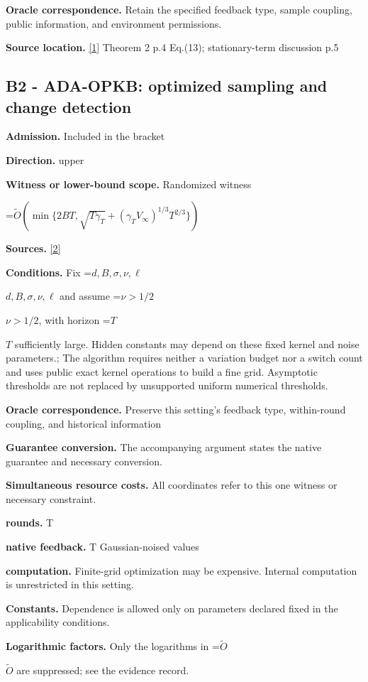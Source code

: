 \documentclass[10pt,a4paper]{article}
\newcommand{\AtlasMath}[1]{\par\begingroup\centering\setbox0=\hbox{$\displaystyle #1$}\ifdim\wd0>1.4\linewidth\typeout{ATLAS WIDE FORMULA: \the\wd0}\fi\ifdim\wd0>\linewidth\resizebox{\linewidth}{!}{\box0}\else\box0\fi\par\endgroup}
\newcommand{\AtlasInlineMath}[1]{\begingroup\setbox0=\hbox{$#1$}\ifdim\wd0>.4\linewidth\endgroup\AtlasMath{#1}\else\endgroup$#1$\fi}
\begin{document}
\textbf{Oracle correspondence.} Retain the specified feedback type, sample coupling, public information, and environment permissions.

\textbf{Source location.} \href{https://raw.githubusercontent.com/mlresearch/v258/main/assets/cai25a/cai25a.pdf}{[1]} Theorem 2 p.4 Eq.(13); stationary-term discussion p.5

\subsection{B2 - ADA-OPKB: optimized sampling and change detection}
\textbf{Admission.} Included in the bracket

\textbf{Direction.} upper

\textbf{Witness or lower-bound scope.} Randomized witness

\AtlasMath{\widetilde{O}\!\left(\min\{2BT,\sqrt{T\gamma_T}+(\gamma_T V_\infty)^{1/3}T^{2/3}\}\right)}
\textbf{Sources.} \href{https://proceedings.mlr.press/v206/hong23b.html}{[2]}

\textbf{Conditions.} Fix \AtlasInlineMath{d,B,\sigma,\nu,\ell} and assume \AtlasInlineMath{\nu>1/2}, with horizon \AtlasInlineMath{T} sufficiently large. Hidden constants may depend on these fixed kernel and noise parameters.; The algorithm requires neither a variation budget nor a switch count and uses public exact kernel operations to build a fine grid. Asymptotic thresholds are not replaced by unsupported uniform numerical thresholds.

\textbf{Oracle correspondence.} Preserve this setting's feedback type, within-round coupling, and historical information

\textbf{Guarantee conversion.} The accompanying argument states the native guarantee and necessary conversion.

\textbf{Simultaneous resource costs.} All coordinates refer to this one witness or necessary constraint.

\textbf{rounds.} T

\textbf{native feedback.} T Gaussian-noised values

\textbf{computation.} Finite-grid optimization may be expensive. Internal computation is unrestricted in this setting.

\textbf{Constants.} Dependence is allowed only on parameters declared fixed in the applicability conditions.

\textbf{Logarithmic factors.} Only the logarithms in \AtlasInlineMath{\widetilde O} are suppressed; see the evidence record.
\end{document}
